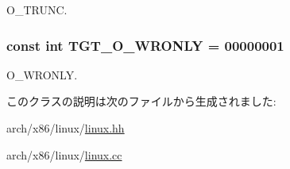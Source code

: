 O\_\-TRUNC. \hypertarget{classX86Linux32_a6156c069cefe05ce3cce033b2e0c2de2}{
\subsubsection[{TGT\_\-O\_\-WRONLY}]{\setlength{\rightskip}{0pt plus 5cm}const int {\bf TGT\_\-O\_\-WRONLY} = 00000001}}
\label{classX86Linux32_a6156c069cefe05ce3cce033b2e0c2de2}


O\_\-WRONLY. 

このクラスの説明は次のファイルから生成されました:\begin{DoxyCompactItemize}
\item 
arch/x86/linux/\hyperlink{arch_2x86_2linux_2linux_8hh}{linux.hh}\item 
arch/x86/linux/\hyperlink{arch_2x86_2linux_2linux_8cc}{linux.cc}\end{DoxyCompactItemize}

